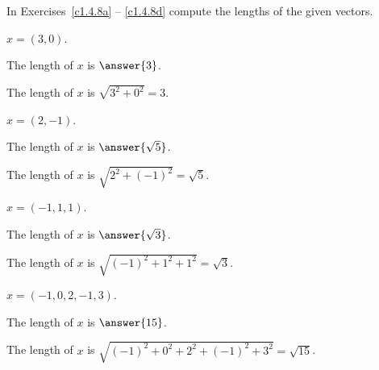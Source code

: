 \documentclass{ximera}
\begin{document}
\noindent In Exercises~\ref{c1.4.8a} -- \ref{c1.4.8d}
compute the lengths of the given vectors.
\begin{exercise} \label{c1.4.8a}
$x=(3,0)$.  \begin{prompt} The length of $x$ is $\answer{3}$.\end{prompt}

\begin{solution}
\ans The length of $x$ is $\sqrt{3^2 + 0^2} = 3$.

\end{solution}
\end{exercise}
\begin{exercise} \label{c1.4.8b}
$x=(2,-1)$.  \begin{prompt} The length of $x$ is $\answer{\sqrt{5}}$.\end{prompt}

\begin{solution}
\ans The length of $x$ is $\sqrt{2^2 + (-1)^2} = \sqrt{5}$.

\end{solution}
\end{exercise}
\begin{exercise} \label{c1.4.8c}
$x=(-1,1,1)$.  \begin{prompt} The length of $x$ is $\answer{\sqrt{3}}$.\end{prompt}

\begin{solution}
\ans The length of $x$ is $\sqrt{(-1)^2 + 1^2 + 1^2} =
\sqrt{3}$.

\end{solution}
\end{exercise}
\begin{exercise} \label{c1.4.8d}
$x=(-1,0,2,-1,3)$.  \begin{prompt} The length of $x$ is $\answer{15}$.\end{prompt}

\begin{solution}
\ans The length of $x$ is $\sqrt{(-1)^2 + 0^2 + 2^2 +
(-1)^2 + 3^2} = \sqrt{15}$.


\end{solution}
\end{exercise}
\end{document}
